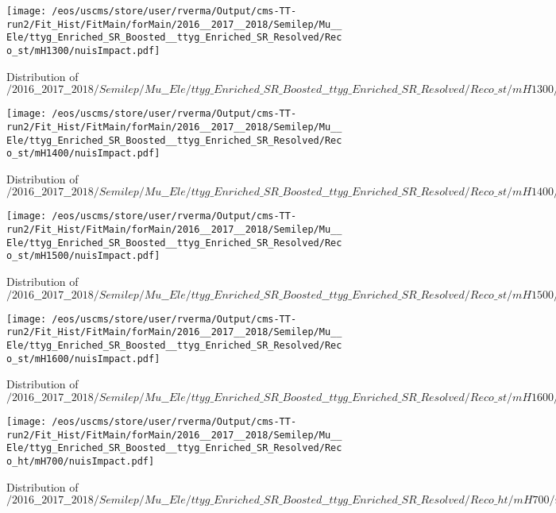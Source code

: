 \begin{figure}
\centering
\texttt{[image: /eos/uscms/store/user/rverma/Output/cms-TT-run2/Fit\_Hist/FitMain/forMain/2016\_\_2017\_\_2018/Semilep/Mu\_\_Ele/ttyg\_Enriched\_SR\_Boosted\_\_ttyg\_Enriched\_SR\_Resolved/Reco\_st/mH1300/nuisImpact.pdf]}
\caption{Distribution of $/2016\_\_2017\_\_2018/Semilep/Mu\_\_Ele/ttyg\_Enriched\_SR\_Boosted\_\_ttyg\_Enriched\_SR\_Resolved/Reco\_st/mH1300/nuisImpact.pdf$}
\end{figure}

\begin{figure}
\centering
\texttt{[image: /eos/uscms/store/user/rverma/Output/cms-TT-run2/Fit\_Hist/FitMain/forMain/2016\_\_2017\_\_2018/Semilep/Mu\_\_Ele/ttyg\_Enriched\_SR\_Boosted\_\_ttyg\_Enriched\_SR\_Resolved/Reco\_st/mH1400/nuisImpact.pdf]}
\caption{Distribution of $/2016\_\_2017\_\_2018/Semilep/Mu\_\_Ele/ttyg\_Enriched\_SR\_Boosted\_\_ttyg\_Enriched\_SR\_Resolved/Reco\_st/mH1400/nuisImpact.pdf$}
\end{figure}

\begin{figure}
\centering
\texttt{[image: /eos/uscms/store/user/rverma/Output/cms-TT-run2/Fit\_Hist/FitMain/forMain/2016\_\_2017\_\_2018/Semilep/Mu\_\_Ele/ttyg\_Enriched\_SR\_Boosted\_\_ttyg\_Enriched\_SR\_Resolved/Reco\_st/mH1500/nuisImpact.pdf]}
\caption{Distribution of $/2016\_\_2017\_\_2018/Semilep/Mu\_\_Ele/ttyg\_Enriched\_SR\_Boosted\_\_ttyg\_Enriched\_SR\_Resolved/Reco\_st/mH1500/nuisImpact.pdf$}
\end{figure}

\begin{figure}
\centering
\texttt{[image: /eos/uscms/store/user/rverma/Output/cms-TT-run2/Fit\_Hist/FitMain/forMain/2016\_\_2017\_\_2018/Semilep/Mu\_\_Ele/ttyg\_Enriched\_SR\_Boosted\_\_ttyg\_Enriched\_SR\_Resolved/Reco\_st/mH1600/nuisImpact.pdf]}
\caption{Distribution of $/2016\_\_2017\_\_2018/Semilep/Mu\_\_Ele/ttyg\_Enriched\_SR\_Boosted\_\_ttyg\_Enriched\_SR\_Resolved/Reco\_st/mH1600/nuisImpact.pdf$}
\end{figure}

\begin{figure}
\centering
\texttt{[image: /eos/uscms/store/user/rverma/Output/cms-TT-run2/Fit\_Hist/FitMain/forMain/2016\_\_2017\_\_2018/Semilep/Mu\_\_Ele/ttyg\_Enriched\_SR\_Boosted\_\_ttyg\_Enriched\_SR\_Resolved/Reco\_ht/mH700/nuisImpact.pdf]}
\caption{Distribution of $/2016\_\_2017\_\_2018/Semilep/Mu\_\_Ele/ttyg\_Enriched\_SR\_Boosted\_\_ttyg\_Enriched\_SR\_Resolved/Reco\_ht/mH700/nuisImpact.pdf$}
\end{figure}

